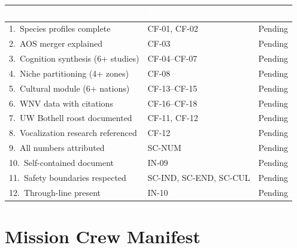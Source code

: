 \documentclass[11pt,letterpaper]{article}
\newcommand{\tableheader}[1]{\textbf{\sffamily\textcolor{white}{#1}}}
\begin{document}
\begin{center}
\begin{tabularx}{\textwidth}{XL{3.5cm}C{1.5cm}}
\toprule
{}
\tableheader{Success Criterion} & \tableheader{Test ID(s)} & \tableheader{Status} \\
.\ Species profiles complete & CF-01, CF-02 & Pending \\
2.\ AOS merger explained & CF-03 & Pending \\
3.\ Cognition synthesis (6+ studies) & CF-04--CF-07 & Pending \\
4.\ Niche partitioning (4+ zones) & CF-08 & Pending \\
5.\ Cultural module (6+ nations) & CF-13--CF-15 & Pending \\
6.\ WNV data with citations & CF-16--CF-18 & Pending \\
7.\ UW Bothell roost documented & CF-11, CF-12 & Pending \\
8.\ Vocalization research referenced & CF-12 & Pending \\
9.\ All numbers attributed & SC-NUM & Pending \\
10.\ Self-contained document & IN-09 & Pending \\
11.\ Safety boundaries respected & SC-IND, SC-END, SC-CUL & Pending \\
12.\ Through-line present & IN-10 & Pending \\
\bottomrule
\end{tabularx}
\end{center}

\section{Mission Crew Manifest}
\end{document}
